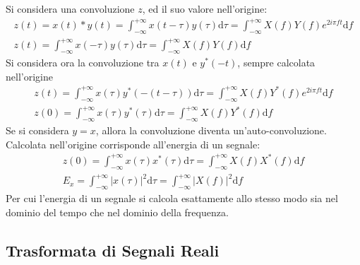 \documentclass{article}
\newcommand{\df}{\mathrm{d}}
\numberwithin{equation}{subsection}
\begin{document}
Si considera una convoluzione $z$, ed il suo valore nell'origine:
\begin{gather*}
    z(t)=x(t)*y(t)=\displaystyle\int_{-\infty}^{+\infty}x(t-\tau)y(\tau)\df\tau=\int_{-\infty}^{+\infty}X(f)Y(f)e^{2i\pi ft}\df f\\
    z(t)=\displaystyle\int_{-\infty}^{+\infty}x(-\tau)y(\tau)\df\tau=\int_{-\infty}^{+\infty}X(f)Y(f)\df f 
\end{gather*}
Si considera ora la convoluzione tra $x(t)$ e $y^*(-t)$, sempre calcolata nell'origine
\begin{gather*}
    z(t)=\displaystyle\int_{-\infty}^{+\infty}x(\tau)y^*(-(t-\tau))\df\tau=\int_{-\infty}^{+\infty}X(f)Y^*(f)e^{2i\pi ft}\df f\\
    z(0)=\displaystyle\int_{-\infty}^{+\infty}x(\tau)y^*(\tau)\df\tau=\int_{-\infty}^{+\infty}X(f)Y^*(f)\df f
\end{gather*}
Se si considera $y=x$, allora la convoluzione diventa un'auto-convoluzione. Calcolata nell'origine corrisponde all'energia di un segnale:
\begin{gather*}
    z(0)=\displaystyle\int_{-\infty}^{+\infty}x(\tau)x^*(\tau)\df\tau=\int_{-\infty}^{+\infty}X(f)X^*(f)\df f\\
    E_x=\displaystyle\int_{-\infty}^{+\infty}|x(\tau)|^2\df\tau=\int_{-\infty}^{+\infty}|X(f)|^2\df f
\end{gather*}
Per cui l'energia di un segnale si calcola esattamente allo stesso modo sia nel dominio del tempo che nel dominio della frequenza. 

\subsection{Trasformata di Segnali Reali}
\end{document}

